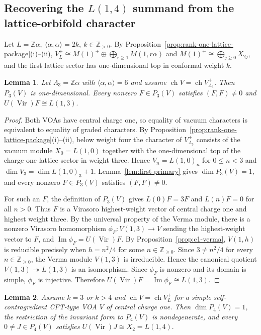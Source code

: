 \documentclass[10pt,a4paper]{amsart}
\numberwithin{equation}{section} \newtheorem{thm}{Theorem}[section] \newtheorem{lem}[thm]{Lemma} \newtheorem{ex}[thm]{Example} \newtheorem{prop}[thm]{Proposition} \newtheorem{cor}[thm]{Corollary} \newtheorem{defi}[thm]{Definition} \newtheorem{rmk}[thm]{Remark} \newtheorem{notation}[thm]{Notation}
\newcommand{\Vir}{\operatorname{Vir}}
\newcommand{\ch}{\operatorname{ch}}
\def\Z{\mathbb{Z}} \def\N{\mathbb{N}} \def\A{\mathbb{A}} \def\C{\mathbb{C}} \def\R{\mathbb{R}} \def\Q{\mathbb{Q}} \def\F{\mathbb{F}}
\begin{document}
\subsection{Recovering the \texorpdfstring{$L(1,4)$}{L(1,4)} summand from the lattice-orbifold character}

Let \(L=\Z\alpha,\ \langle\alpha,\alpha\rangle=2k,\ k\in\Z_{>0}\). By Proposition~\ref{prop:rank-one-lattice-package}(i)--(ii), \(V_L^+\cong M(1)^+\oplus\bigoplus_{r\ge1}M(1,r\alpha)\) and \(M(1)^+\cong\bigoplus_{j\ge0}X_{2j}\), and the first lattice sector has one-dimensional top in conformal weight $k$.

\begin{lem}\label{lem:k3-weight3}
Let $\Lambda_3=\Z\alpha$ with $\langle\alpha,\alpha\rangle=6$ and assume $\ch V=\ch V_{\Lambda_3}^+$. Then $P_3(V)$ is one-dimensional. Every nonzero $F\in P_3(V)$ satisfies \((F,F)\ne0\) and \(U(\Vir)F\cong L(1,3).\)
\end{lem}

\begin{proof}
Both VOAs have central charge one, so equality of vacuum characters is equivalent to equality of graded characters. By Proposition~\ref{prop:rank-one-lattice-package}(i)--(ii), below weight four the character of $V_{\Lambda_3}^+$ consists of the vacuum module $X_0=L(1,0)$ together with the one-dimensional top of the charge-one lattice sector in weight three. Hence $V_n=L(1,0)_n$ for $0\le n<3$ and $\dim V_3=\dim L(1,0)_3+1$. Lemma~\ref{lem:first-primary} gives $\dim P_3(V)=1$, and every nonzero $F\in P_3(V)$ satisfies $(F,F)\ne0$.

For such an $F$, the definition of $P_3(V)$ gives \(L(0)F=3F\) and \(L(n)F=0\) for all $n>0$. Thus $F$ is a Virasoro highest-weight vector of central charge one and highest weight three. By the universal property of the Verma module, there is a nonzero Virasoro homomorphism \(\phi_F:V(1,3)\longrightarrow V\) sending the highest-weight vector to $F$, and \(\operatorname{Im}\phi_F=U(\Vir)F.\) By Proposition~\ref{prop:c1-verma}, $V(1,h)$ is reducible precisely when \(h=n^2/4\) for some $n\in\Z_{\ge0}$. Since \(3\ne n^2/4\) for every $n\in\Z_{\ge0}$, the Verma module $V(1,3)$ is irreducible. Hence the canonical quotient \(V(1,3)\twoheadrightarrow L(1,3)\) is an isomorphism. Since $\phi_F$ is nonzero and its domain is simple, $\phi_F$ is injective. Therefore \(U(\Vir)F=\operatorname{Im}\phi_F\cong L(1,3).\)
\end{proof}

\begin{lem}\label{lem:intervening}
Assume $k=3$ or $k>4$ and \(\ch V=\ch V_L^+\) for a simple self-contragredient CFT-type VOA $V$ of central charge one. Then \(\dim P_4(V)=1\), the restriction of the invariant form to \(P_4(V)\) is nondegenerate, and every \(0\ne J\in P_4(V)\) satisfies \(U(\Vir)J\cong X_2=L(1,4).\)
\end{lem}
\end{document}
